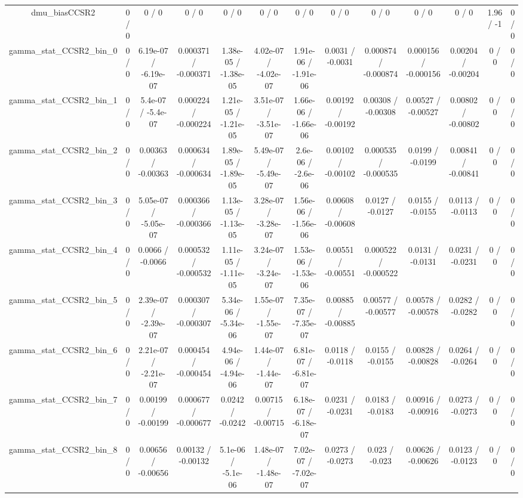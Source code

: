 \documentclass[10pt]{article}
\begin{document}
\begin{table}[htbp]
\begin{center}
\begin{tabular}{|c|c|c|c|c|c|c|c|c|c|c|c|c|}
  dmu_biasCCSR2 & 0 / 0 & 0 / 0 & 0 / 0 & 0 / 0 & 0 / 0 & 0 / 0 & 0 / 0 & 0 / 0 & 0 / 0 & 0 / 0 & 1.96 / -1 & 0 / 0 \\ 
  gamma_stat_CCSR2_bin_0 & 0 / 0 & 6.19e-07 / -6.19e-07 & 0.000371 / -0.000371 & 1.38e-05 / -1.38e-05 & 4.02e-07 / -4.02e-07 & 1.91e-06 / -1.91e-06 & 0.0031 / -0.0031 & 0.000874 / -0.000874 & 0.000156 / -0.000156 & 0.00204 / -0.00204 & 0 / 0 & 0 / 0 \\ 
  gamma_stat_CCSR2_bin_1 & 0 / 0 & 5.4e-07 / -5.4e-07 & 0.000224 / -0.000224 & 1.21e-05 / -1.21e-05 & 3.51e-07 / -3.51e-07 & 1.66e-06 / -1.66e-06 & 0.00192 / -0.00192 & 0.00308 / -0.00308 & 0.00527 / -0.00527 & 0.00802 / -0.00802 & 0 / 0 & 0 / 0 \\ 
  gamma_stat_CCSR2_bin_2 & 0 / 0 & 0.00363 / -0.00363 & 0.000634 / -0.000634 & 1.89e-05 / -1.89e-05 & 5.49e-07 / -5.49e-07 & 2.6e-06 / -2.6e-06 & 0.00102 / -0.00102 & 0.000535 / -0.000535 & 0.0199 / -0.0199 & 0.00841 / -0.00841 & 0 / 0 & 0 / 0 \\ 
  gamma_stat_CCSR2_bin_3 & 0 / 0 & 5.05e-07 / -5.05e-07 & 0.000366 / -0.000366 & 1.13e-05 / -1.13e-05 & 3.28e-07 / -3.28e-07 & 1.56e-06 / -1.56e-06 & 0.00608 / -0.00608 & 0.0127 / -0.0127 & 0.0155 / -0.0155 & 0.0113 / -0.0113 & 0 / 0 & 0 / 0 \\ 
  gamma_stat_CCSR2_bin_4 & 0 / 0 & 0.0066 / -0.0066 & 0.000532 / -0.000532 & 1.11e-05 / -1.11e-05 & 3.24e-07 / -3.24e-07 & 1.53e-06 / -1.53e-06 & 0.00551 / -0.00551 & 0.000522 / -0.000522 & 0.0131 / -0.0131 & 0.0231 / -0.0231 & 0 / 0 & 0 / 0 \\ 
  gamma_stat_CCSR2_bin_5 & 0 / 0 & 2.39e-07 / -2.39e-07 & 0.000307 / -0.000307 & 5.34e-06 / -5.34e-06 & 1.55e-07 / -1.55e-07 & 7.35e-07 / -7.35e-07 & 0.00885 / -0.00885 & 0.00577 / -0.00577 & 0.00578 / -0.00578 & 0.0282 / -0.0282 & 0 / 0 & 0 / 0 \\ 
  gamma_stat_CCSR2_bin_6 & 0 / 0 & 2.21e-07 / -2.21e-07 & 0.000454 / -0.000454 & 4.94e-06 / -4.94e-06 & 1.44e-07 / -1.44e-07 & 6.81e-07 / -6.81e-07 & 0.0118 / -0.0118 & 0.0155 / -0.0155 & 0.00828 / -0.00828 & 0.0264 / -0.0264 & 0 / 0 & 0 / 0 \\ 
  gamma_stat_CCSR2_bin_7 & 0 / 0 & 0.00199 / -0.00199 & 0.000677 / -0.000677 & 0.0242 / -0.0242 & 0.00715 / -0.00715 & 6.18e-07 / -6.18e-07 & 0.0231 / -0.0231 & 0.0183 / -0.0183 & 0.00916 / -0.00916 & 0.0273 / -0.0273 & 0 / 0 & 0 / 0 \\ 
  gamma_stat_CCSR2_bin_8 & 0 / 0 & 0.00656 / -0.00656 & 0.00132 / -0.00132 & 5.1e-06 / -5.1e-06 & 1.48e-07 / -1.48e-07 & 7.02e-07 / -7.02e-07 & 0.0273 / -0.0273 & 0.023 / -0.023 & 0.00626 / -0.00626 & 0.0123 / -0.0123 & 0 / 0 & 0 / 0 \\ 

\end{tabular}
\end{center}
\end{table}
\end{document}
